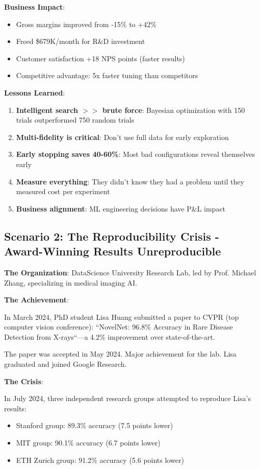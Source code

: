 \textbf{Business Impact}:
\begin{itemize}
    \item Gross margins improved from -15\% to +42\%
    \item Freed \$679K/month for R\&D investment
    \item Customer satisfaction +18 NPS points (faster results)
    \item Competitive advantage: 5x faster tuning than competitors
\end{itemize}

\textbf{Lessons Learned}:

\begin{enumerate}
    \item \textbf{Intelligent search $>>$ brute force}: Bayesian optimization with 150 trials outperformed 750 random trials
    \item \textbf{Multi-fidelity is critical}: Don't use full data for early exploration
    \item \textbf{Early stopping saves 40-60\%}: Most bad configurations reveal themselves early
    \item \textbf{Measure everything}: They didn't know they had a problem until they measured cost per experiment
    \item \textbf{Business alignment}: ML engineering decisions have P\&L impact
\end{enumerate}

\subsection{Scenario 2: The Reproducibility Crisis - Award-Winning Results Unreproducible}

\textbf{The Organization}: DataScience University Research Lab, led by Prof. Michael Zhang, specializing in medical imaging AI.

\textbf{The Achievement}:

In March 2024, PhD student Lisa Huang submitted a paper to CVPR (top computer vision conference): ``NovelNet: 96.8\% Accuracy in Rare Disease Detection from X-rays``---a 4.2\% improvement over state-of-the-art.

The paper was accepted in May 2024. Major achievement for the lab. Lisa graduated and joined Google Research.

\textbf{The Crisis}:

In July 2024, three independent research groups attempted to reproduce Lisa's results:
\begin{itemize}
    \item Stanford group: 89.3\% accuracy (7.5 points lower)
    \item MIT group: 90.1\% accuracy (6.7 points lower)
    \item ETH Zurich group: 91.2\% accuracy (5.6 points lower)
\end{itemize}


